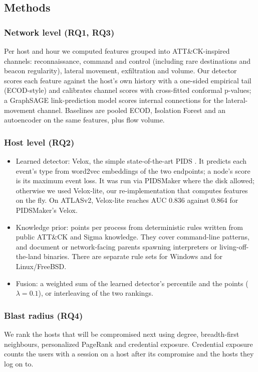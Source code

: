 \documentclass[acmlarge,screen,review]{acmart}
\begin{document}
\subsection{Methods}
\subsubsection{Network level (RQ1, RQ3)}
Per host and hour we computed features grouped into ATT\&CK-inspired channels: reconnaissance, command and control
(including rare destinations and beacon regularity), lateral movement, exfiltration and volume.
Our detector scores each feature against the host's own history with a one-sided empirical tail (ECOD-style) and
calibrates channel scores with cross-fitted conformal p-values; a GraphSAGE link-prediction model scores internal
connections for the lateral-movement channel. Baselines are pooled ECOD, Isolation Forest and an autoencoder on the
same features, plus flow volume.

\subsubsection{Host level (RQ2)}
\begin{itemize}
\item Learned detector: Velox, the simple state-of-the-art PIDS \cite{bilot2025simpler}. It predicts each
event's type from word2vec embeddings of the two endpoints; a node's score is its maximum event loss. It was run via
PIDSMaker where the disk allowed; otherwise we used Velox-lite, our re-implementation that computes features on the
fly. On ATLASv2, Velox-lite reaches AUC 0.836 against 0.864 for PIDSMaker's Velox.
\item Knowledge prior: points per process from deterministic rules written from public ATT\&CK and Sigma
knowledge. They cover command-line patterns, and document or network-facing parents spawning interpreters or
living-off-the-land binaries. There are separate rule sets for Windows and for Linux/FreeBSD.
\item Fusion: a weighted sum of the learned detector's percentile and the points ($\lambda=0.1$), or
interleaving of the two rankings.
\end{itemize}

\subsubsection{Blast radius (RQ4)}
We rank the hosts that will be compromised next using degree, breadth-first neighbours, personalized PageRank and
credential exposure. Credential exposure counts the users with a session on a host after its compromise and the
hosts they log on to.
\end{document}
